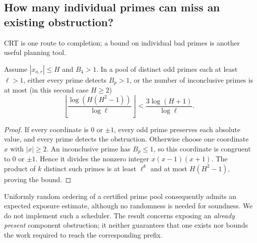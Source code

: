 \subsection{How many individual primes can miss an existing obstruction?}

CRT is one route to completion; a bound on individual bad primes is another
useful planning tool.

\begin{proposition}
\label{prop:prime-exposure}
Assume $|x_{a,r}|\le H$ and $B_4>1$. In a pool of distinct odd primes each
at least $\ell>1$, either every prime detects $B_p>1$, or the number of
inconclusive primes is at most (in this second case $H\ge2$)
\[
 \left\lfloor\frac{\log(H(H^2-1))}{\log\ell}\right\rfloor
 <\frac{3\log(H+1)}{\log\ell}.
\]
\end{proposition}
\begin{proof}
If every coordinate is $0$ or $\pm1$, every odd prime preserves each absolute
value, and every prime detects the obstruction. Otherwise choose one coordinate
$x$ with $|x|\ge2$. An inconclusive prime has $B_p\le1$, so this coordinate
is congruent to $0$ or $\pm1$. Hence it divides the nonzero integer
$x(x-1)(x+1)$. The product of $k$ distinct such primes is at least $\ell^k$
and at most $H(H^2-1)$, proving the bound.
\end{proof}

Uniformly random ordering of a certified prime pool consequently admits an
expected exposure estimate, although no randomness is needed for soundness.
We do not implement such a scheduler. The result concerns exposing an
\emph{already present} component obstruction; it neither guarantees that one
exists nor bounds the work required to reach the corresponding prefix.
